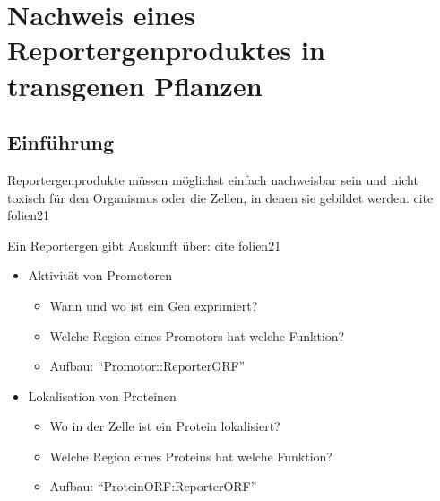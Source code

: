 

\section{Nachweis eines Reportergenproduktes in transgenen Pflanzen}\label{sec:nachweis-eines-reportergenproduktes-in-transgenen-pflanzen}

\subsection{Einführung}\label{subsec:einfuhrung}




Reportergenprodukte müssen möglichst einfach nachweisbar sein und nicht toxisch für den Organismus oder die Zellen,
in denen sie gebildet werden. cite folien21

Ein Reportergen gibt Auskunft über: cite folien21
\begin{itemize}
    \item Aktivität von Promotoren
    \begin{itemize}
        \item Wann und wo ist ein Gen
        exprimiert?
        \item Welche Region eines Promotors hat
        welche Funktion?
        \item Aufbau: ``Promotor::ReporterORF''
    \end{itemize}
    \item Lokalisation von Proteinen
    \begin{itemize}
        \item Wo in der Zelle ist ein Protein
        lokalisiert?
        \item Welche Region eines Proteins hat
        welche Funktion?
        \item Aufbau: ``ProteinORF:ReporterORF''
    \end{itemize}
\end{itemize}



